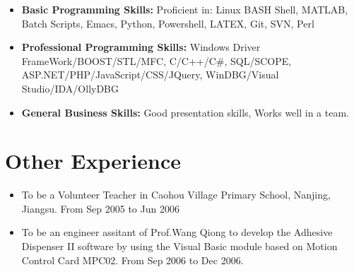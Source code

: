 \documentclass[12pt,a4paper,Times New Roman]{moderncv}        %
\begin{document}
\begin{itemize}

\item \textbf{Basic Programming Skills:} Proficient in: Linux BASH Shell, MATLAB, Batch Scripts, Emacs, Python, Powershell, LATEX, Git, SVN, Perl

\vspace{4pt}

\item \textbf{Professional Programming Skills:} Windows Driver FrameWork/BOOST/STL/MFC, C/C++/C\#, SQL/SCOPE, ASP.NET/PHP/JavaScript/CSS/JQuery, WinDBG/Visual Studio/IDA/OllyDBG

\vspace{4pt}

\item \textbf{General Business Skills:} Good presentation skills, Works well in a team.

\end{itemize}

\section{Other Experience}

\vspace{4pt}

\begin{itemize}

\item{To be a Volunteer Teacher in Caohou Village Primary School, Nanjing, Jiangsu. From Sep 2005 to Jun 2006}

\vspace{4pt}

\item{To be an engineer assitant of Prof.Wang Qiong to develop the Adhesive Dispenser II software by using the Visual Basic module based on Motion Control Card MPC02. From Sep 2006 to Dec 2006. }

\end{itemize}




%


\thispagestyle{plain}
\end{document}
